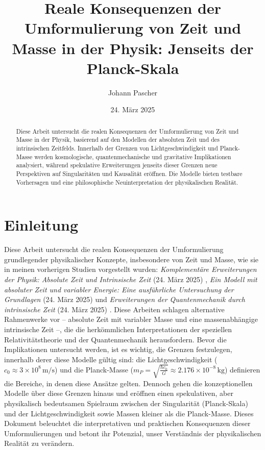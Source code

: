 \documentclass[a4paper,12pt]{article}
\title{Reale Konsequenzen der Umformulierung von Zeit und Masse in der Physik: Jenseits der Planck-Skala}
\author{Johann Pascher}
\date{24. März 2025}
\begin{document}
	
	\maketitle
	
	\begin{abstract}
		Diese Arbeit untersucht die realen Konsequenzen der Umformulierung von Zeit und Masse in der Physik, basierend auf den Modellen der absoluten Zeit und des intrinsischen Zeitfelds. Innerhalb der Grenzen von Lichtgeschwindigkeit und Planck-Masse werden kosmologische, quantenmechanische und gravitative Implikationen analysiert, während spekulative Erweiterungen jenseits dieser Grenzen neue Perspektiven auf Singularitäten und Kausalität eröffnen. Die Modelle bieten testbare Vorhersagen und eine philosophische Neuinterpretation der physikalischen Realität.
	\end{abstract}
	
	\tableofcontents
	\newpage
	
	\section{Einleitung}
	Diese Arbeit untersucht die realen Konsequenzen der Umformulierung grundlegender physikalischer Konzepte, insbesondere von Zeit und Masse, wie sie in meinen vorherigen Studien vorgestellt wurden: \textit{Komplementäre Erweiterungen der Physik: Absolute Zeit und Intrinsische Zeit} (24. März 2025) \cite{komplementaer}\relax, \textit{Ein Modell mit absoluter Zeit und variabler Energie: Eine ausführliche Untersuchung der Grundlagen} (24. März 2025) \cite{absolateZeit}\relax und \textit{Erweiterungen der Quantenmechanik durch intrinsische Zeit} (24. März 2025) \cite{erweiterungenQM}\relax. Diese Arbeiten schlagen alternative Rahmenwerke vor – absolute Zeit mit variabler Masse und eine massenabhängige intrinsische Zeit –, die die herkömmlichen Interpretationen der speziellen Relativitätstheorie und der Quantenmechanik herausfordern. Bevor die Implikationen untersucht werden, ist es wichtig, die Grenzen festzulegen, innerhalb derer diese Modelle gültig sind: die Lichtgeschwindigkeit (\( c_0 \approx 3 \times 10^8 \, \text{m/s} \)) und die Planck-Masse (\( m_P = \sqrt{\frac{\hbar c_0}{G}} \approx 2.176 \times 10^{-8} \, \text{kg} \)) definieren die Bereiche, in denen diese Ansätze gelten. Dennoch gehen die konzeptionellen Modelle über diese Grenzen hinaus und eröffnen einen spekulativen, aber physikalisch bedeutsamen Spielraum zwischen der Singularität (Planck-Skala) und der Lichtgeschwindigkeit sowie Massen kleiner als die Planck-Masse. Dieses Dokument beleuchtet die interpretativen und praktischen Konsequenzen dieser Umformulierungen und betont ihr Potenzial, unser Verständnis der physikalischen Realität zu verändern.
	
\end{document}
